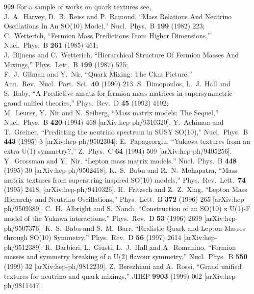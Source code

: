 \begin{thebibliography}{999}
For a sample of works on quark textures see, \\
 J.~A.~Harvey, D.~B.~Reiss and P.~Ramond,
  ``Mass Relations And Neutrino Oscillations In An SO(10) Model,''
  Nucl.\ Phys.\ B {\bf 199} (1982) 223;\\
C.~Wetterich,
  ``Fermion Mass Predictions From Higher Dimensions,''
  Nucl.\ Phys.\ B {\bf 261} (1985) 461;\\
 J.~Bijnens and C.~Wetterich,
  ``Hierarchical Structure Of Fermion Masses And Mixings,''
  Phys.\ Lett.\ B {\bf 199} (1987) 525;\\
 F.~J.~Gilman and Y.~Nir,
  ``Quark Mixing: The Ckm Picture,''
  Ann.\ Rev.\ Nucl.\ Part.\ Sci.\  {\bf 40} (1990) 213.
S.~Dimopoulos, L.~J.~Hall and S.~Raby,
  ``A Predictive ansatz for fermion mass matrices in supersymmetric grand
  unified theories,''
  Phys.\ Rev.\ D {\bf 45} (1992) 4192;\\
    M.~Leurer, Y.~Nir and N.~Seiberg,
  ``Mass matrix models: The Sequel,''
  Nucl.\ Phys.\ B {\bf 420} (1994) 468
  [arXiv:hep-ph/9310320].
  Y.~Achiman and T.~Greiner,
  ``Predicting the neutrino spectrum in SUSY SO(10),''
  Nucl.\ Phys.\ B {\bf 443} (1995) 3
  [arXiv:hep-ph/9502304];
  E.~Papageorgiu,
  ``Yukawa textures from an extra U(1) symmetry?,''
  Z.\ Phys.\ C {\bf 64} (1994) 509
  [arXiv:hep-ph/9405256].
 Y.~Grossman and Y.~Nir,
  ``Lepton mass matrix models,''
  Nucl.\ Phys.\ B {\bf 448} (1995) 30
  [arXiv:hep-ph/9502418].
 K.~S.~Babu and R.~N.~Mohapatra,
  ``Mass matrix textures from superstring inspired SO(10) models,''
  Phys.\ Rev.\ Lett.\  {\bf 74} (1995) 2418;
  [arXiv:hep-ph/9410326].
 H.~Fritzsch and Z.~Z.~Xing,
  ``Lepton Mass Hierarchy and Neutrino Oscillations,''
  Phys.\ Lett.\ B {\bf 372} (1996) 265
 [arXiv:hep-ph/9509389].
 C.~H.~Albright and S.~Nandi,
  ``Construction of an SO(10) x U(1)-F model of the Yukawa interactions,''
  Phys.\ Rev.\ D {\bf 53} (1996) 2699
  [arXiv:hep-ph/9507376].
  K.~S.~Babu and S.~M.~Barr,
  ``Realistic Quark and Lepton Masses through SO(10) Symmetry,''
  Phys.\ Rev.\ D {\bf 56} (1997) 2614
  [arXiv:hep-ph/9512389].
  R.~Barbieri, L.~Giusti, L.~J.~Hall and A.~Romanino,
  ``Fermion masses and symmetry breaking of a U(2) flavour symmetry,''
  Nucl.\ Phys.\ B {\bf 550} (1999) 32
  [arXiv:hep-ph/9812239].
 Z.~Berezhiani and A.~Rossi,
  ``Grand unified textures for neutrino and quark mixings,''
  JHEP {\bf 9903} (1999) 002
  [arXiv:hep-ph/9811447].


\end{thebibliography}

